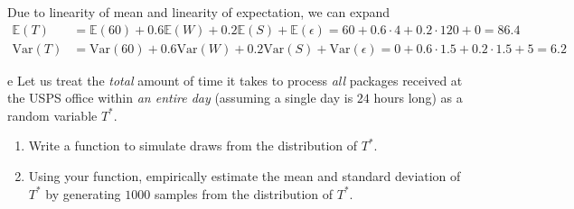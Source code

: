 \documentclass[expanded]{pset}
\begin{document}
\begin{parts}
  Due to linearity of mean and linearity of expectation, we can expand
  \[
    \begin{aligned}
      \mathbb{E}(T) &= \mathbb{E}(60)+0.6\mathbb{E}(W) + 0.2\mathbb{E}(S)+\mathbb{E}(\epsilon) = 60+0.6\cdot 4 + 0.2\cdot 120 + 0 = 86.4\\
      \mathrm{Var}(T) &= \mathrm{Var}(60)+0.6\mathrm{Var}(W) + 0.2\mathrm{Var}(S)+\mathrm{Var}(\epsilon) = 0 + 0.6\cdot 1.5 + 0.2\cdot 1.5 + 5 = 6.2
    \end{aligned}
  \]

  \begin{part}{e}
     Let us treat the \textit{total} amount of time it takes to process \textit{all} packages received at the USPS office within \textit{an entire day} (assuming a single day is $24$ hours long) as a random variable $T^{*}$. 
    \begin{enumerate}
        \item Write a function to simulate draws from the distribution of $T^{*}$. 
        \item Using your function, empirically estimate the mean and standard deviation of $T^{*}$ by generating $1000$ samples from the distribution of $T^{*}$.
    \end{enumerate}
  \end{part}
\end{parts}
\end{document}
